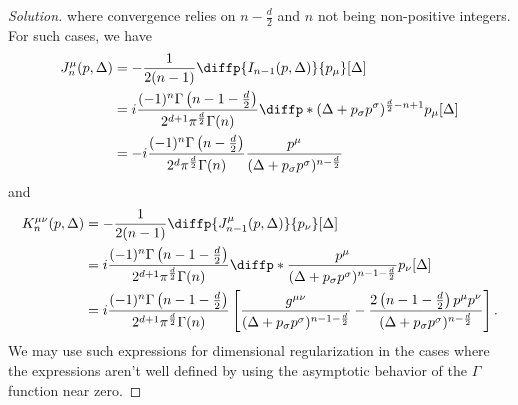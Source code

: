 \begin{proof}[Solution]
   where convergence relies on \(n - \frac{d}{2}\) and \(n\) not being non-positive integers. For such cases, we have
   \begin{align*}
      J^\mu_{n}(p, \Delta) &= - \frac{1}{2(n - 1)} \diffp{I_{n - 1}(p, \Delta)}{p_\mu}[\Delta]\\
                           &= i\frac{(-1)^n \Gamma\left(n - 1 - \frac{d}{2}\right)}{2^{d+1}  \pi^{\frac{d}{2}} \Gamma(n)} \diffp*{(\Delta + p_\sigma p^\sigma)^{\frac{d}{2} - n + 1}}{p_\mu}[\Delta]\\
                           &= -i\frac{(-1)^{n} \Gamma\left(n - \frac{d}{2}\right)}{2^{d}  \pi^{\frac{d}{2}} \Gamma(n)} \frac{p^\mu}{(\Delta + p_\sigma p^\sigma)^{n - \frac{d}{2}}}
   \end{align*}
   and
   \begin{align*}
      K^{\mu\nu}_{n}(p, \Delta) &= - \frac{1}{2(n - 1)} \diffp{J^\mu_{n - 1}(p, \Delta)}{p_\nu}[\Delta]\\
                                &= i\frac{(-1)^n \Gamma\left(n - 1 - \frac{d}{2}\right)}{2^{d+1}  \pi^{\frac{d}{2}} \Gamma(n)} \diffp*{\frac{p^\mu}{(\Delta + p_\sigma p^\sigma)^{n - 1 - \frac{d}{2}}}}{p_\nu}[\Delta]\\
                                &= i\frac{(-1)^n \Gamma\left(n - 1 - \frac{d}{2}\right)}{2^{d+1}  \pi^{\frac{d}{2}} \Gamma(n)} \left[\frac{g^{\mu\nu}}{(\Delta + p_\sigma p^\sigma)^{n - 1 - \frac{d}{2}}} - \frac{2\left(n - 1 - \frac{d}{2}\right) p^\mu p^\nu}{(\Delta +p_\sigma p^\sigma)^{n - \frac{d}{2}}}\right].
   \end{align*}
   We may use such expressions for dimensional regularization in the cases where the expressions aren't well defined by using the asymptotic behavior of the \(\Gamma\) function near zero.
\end{proof}
